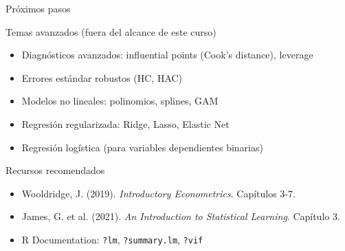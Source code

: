 \documentclass[aspectratio=169, 11pt]{beamer}
\begin{document}
\begin{frame}{Pr\'oximos pasos}
\begin{exampleblock}{Temas avanzados (fuera del alcance de este curso)}
\begin{itemize}
  \item Diagn\'osticos avanzados: influential points (Cook's distance), leverage
  \item Errores est\'andar robustos (HC, HAC)
  \item Modelos no lineales: polinomios, splines, GAM
  \item Regresi\'on regularizada: Ridge, Lasso, Elastic Net
  \item Regresi\'on log\'istica (para variables dependientes binarias)
\end{itemize}
\end{exampleblock}

\begin{block}{Recursos recomendados}
\begin{itemize}
  \item Wooldridge, J. (2019). \textit{Introductory Econometrics}. Cap\'itulos 3-7.
  \item James, G. et al. (2021). \textit{An Introduction to Statistical Learning}. Cap\'itulo 3.
  \item R Documentation: \texttt{?lm}, \texttt{?summary.lm}, \texttt{?vif}
\end{itemize}
\end{block}
\end{frame}
\end{document}
